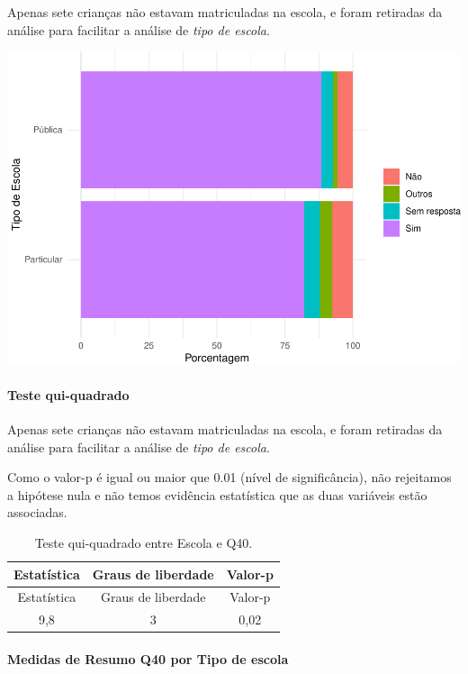 \documentclass[]{article}
\let\oldparagraph\paragraph
\renewcommand{\paragraph}[1]{\oldparagraph{#1}\mbox{}}
\begin{document}
Apenas sete crianças não estavam matriculadas na escola, e foram retiradas da análise para facilitar a análise de \emph{tipo de escola}.

\begin{center}\includegraphics[width=0.75\linewidth]{relatorio_covid19_files/figure-latex/unnamed-chunk-1588-1} \end{center}

\hypertarget{teste-qui-quadrado-136}{%
\paragraph{Teste qui-quadrado}\label{teste-qui-quadrado-136}}

Apenas sete crianças não estavam matriculadas na escola, e foram retiradas da análise para facilitar a análise de \emph{tipo de escola}.

Como o valor-p é igual ou maior que 0.01 (nível de significância), não rejeitamos a hipótese nula e não temos evidência estatística que as duas variáveis estão associadas.

\begin{longtable}[]{@{}ccc@{}}
\caption{\label{tab:unnamed-chunk-1590}Teste qui-quadrado entre Escola e Q40.}\tabularnewline
\toprule
Estatística & Graus de liberdade & Valor-p\tabularnewline
\midrule
\endfirsthead
\toprule
Estatística & Graus de liberdade & Valor-p\tabularnewline
\midrule
\endhead
9,8 & 3 & 0,02\tabularnewline
\bottomrule
\end{longtable}

\cleardoublepage

\hypertarget{medidas-de-resumo-q40-por-tipo-de-escola}{%
\paragraph{Medidas de Resumo Q40 por Tipo de escola}\label{medidas-de-resumo-q40-por-tipo-de-escola}}
\end{document}
